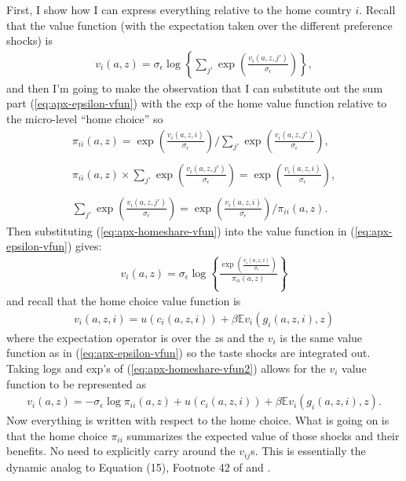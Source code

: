 \documentclass[12pt,pdftex]{article}
\begin{document}
\begin{onehalfspacing}
First, I show how I can express everything relative to the home country $i$. Recall that the value function (with the expectation taken over the different preference shocks) is
\begin{align}
v_i(a, z) =  \sigma_{\epsilon} \log \left\{ \sum_{j'} \exp \left( \frac{  v_{i}(a, z, j')}{\sigma_{\epsilon}} \right) \right\},
\label{eq:apx-epsilon-vfun}
\end{align}
and then I'm going to make the observation that I can substitute out the sum part (\ref{eq:apx-epsilon-vfun}) with the exp of the home value function relative to the micro-level ``home choice'' so
\begin{align}
\pi_{ii}(a, z) = \exp \left( \frac{ v_{i}(a, z, i) }{\sigma_{\epsilon}} \right) \Bigg / \sum_{j'} \exp \left( \frac{ v_{i}(a, z, j') }{\sigma_{\epsilon}} \right), \\
\nonumber \\
\pi_{ii}(a, z) \times \sum_{j'} \exp \left( \frac{ v_{i}(a, z, j') }{\sigma_{\epsilon}} \right) = \exp \left( \frac{ v_{i}(a, z, i) }{\sigma_{\epsilon}} \right), \\
\nonumber \\
\sum_{j'} \exp \left( \frac{ v_{i}(a, z, j') }{\sigma_{\epsilon}} \right) = \exp \left( \frac{ v_{i}(a, z, i) }{\sigma_{\epsilon}} \right) \Bigg / \pi_{ii}(a, z).
\label{eq:apx-homeshare-vfun}
\end{align}
Then substituting (\ref{eq:apx-homeshare-vfun}) into the value function in (\ref{eq:apx-epsilon-vfun}) gives:
\begin{align}
v_i(a, z) =  \sigma_{\epsilon} \log \left\{ \frac{ \exp \left( \frac{  v_{i}(a, z, i)}{\sigma_{\epsilon}}\right )}{\pi_{ii}(a,z)}  \right\}
\label{eq:apx-homeshare-vfun2}
\end{align}
and recall that the home choice value function is
\begin{align}
v_{i}(a, z, i) = u(c_{i}(a,z,i)) + \beta \mathbb{E} v_{i}(g_{i}(a,z,i),z)
\end{align}
where the expectation operator is over the $z$s and the $v_{i}$ is the same value function as in (\ref{eq:apx-epsilon-vfun}) so the taste shocks are integrated out. Taking logs and exp's of (\ref{eq:apx-homeshare-vfun2}) allows for the $v_i$ value function to be represented as
\begin{align}
v_i(a, z) = -\sigma_{\epsilon} \log \pi_{ii}(a,z) + u(c_{i}(a,z,i)) + \beta \mathbb{E} v_{i}(g_{i}(a,z,i),z).
\label{eq:apx-home-valuefun}
\end{align}
Now everything is written with respect to the home choice. What is going on is that the home choice $\pi_{ii}$ summarizes the expected value of those shocks and their benefits. No need to explicitly carry around the $v_{ij}$s. This is essentially the dynamic analog to Equation (15), Footnote 42 of \citet{eaton2002technology} and \citet{arkolakis2012new}.


\end{onehalfspacing}
\end{document}
